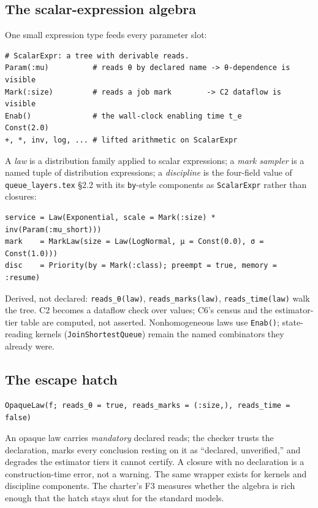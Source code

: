 \documentclass[11pt]{article}
\newcommand{\code}[1]{\texttt{#1}}
\begin{document}
\subsection{The scalar-expression algebra}

One small expression type feeds every parameter slot:

\begin{lstlisting}
# ScalarExpr: a tree with derivable reads.
Param(:mu)          # reads θ by declared name -> θ-dependence is visible
Mark(:size)         # reads a job mark        -> C2 dataflow is visible
Enab()              # the wall-clock enabling time t_e
Const(2.0)
+, *, inv, log, ... # lifted arithmetic on ScalarExpr
\end{lstlisting}

A \emph{law} is a distribution family applied to scalar expressions; a
\emph{mark sampler} is a named tuple of distribution expressions; a
\emph{discipline} is the four-field value of \code{queue\_layers.tex}
\S2.2 with its \code{by}-style components as \code{ScalarExpr} rather than
closures:

\begin{lstlisting}
service = Law(Exponential, scale = Mark(:size) * inv(Param(:mu_short)))
mark    = MarkLaw(size = Law(LogNormal, μ = Const(0.0), σ = Const(1.0)))
disc    = Priority(by = Mark(:class); preempt = true, memory = :resume)
\end{lstlisting}

Derived, not declared: \code{reads\_θ(law)}, \code{reads\_marks(law)},
\code{reads\_time(law)} walk the tree. C2 becomes a dataflow check over
values; C6's census and the estimator-tier table are computed, not asserted.
Nonhomogeneous laws use \code{Enab()}; state-reading kernels
(\code{JoinShortestQueue}) remain the named combinators they already were.

\subsection{The escape hatch}

\begin{lstlisting}
OpaqueLaw(f; reads_θ = true, reads_marks = (:size,), reads_time = false)
\end{lstlisting}

An opaque law carries \emph{mandatory} declared reads; the checker trusts
the declaration, marks every conclusion resting on it as
``declared, unverified,'' and degrades the estimator tiers it cannot
certify. A closure with no declaration is a construction-time error, not a
warning. The same wrapper exists for kernels and discipline components. The
charter's F3 measures whether the algebra is rich enough that the hatch
stays shut for the standard models.
\end{document}
